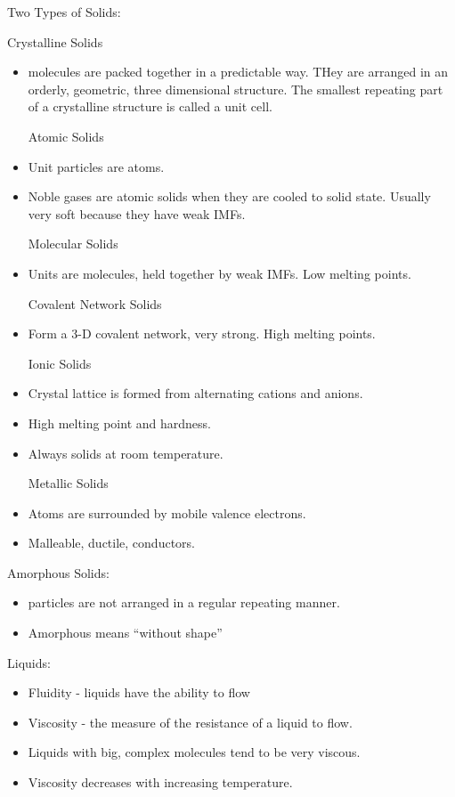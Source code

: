 \documentclass[../hchem.tex]{subfiles}
\begin{document}
Two Types of Solids:

Crystalline Solids
\begin{itemize}
    \item molecules are packed together in a predictable way. THey are arranged in an orderly, geometric, three dimensional 
    structure. The smallest repeating part of a crystalline structure is called a unit cell.

    Atomic Solids 
    \item Unit particles are atoms.
    \item Noble gases are atomic solids when they are cooled to solid state. Usually very soft because they have weak IMFs.
    
    Molecular Solids 
    \item Units are molecules, held together by weak IMFs. Low melting points.
    
    Covalent Network Solids 
    \item Form a 3-D covalent network, very strong. High melting points.
    
    Ionic Solids 
    \item Crystal lattice is formed from alternating cations and anions.
    \item High melting point and hardness.
    \item Always solids at room temperature.
    
    Metallic Solids 
    \item Atoms are surrounded by mobile valence electrons.
    \item Malleable, ductile, conductors.
\end{itemize}

Amorphous Solids:
\begin{itemize}
    \item particles are not arranged in a regular repeating manner.
    \item Amorphous means ``without shape''
\end{itemize}

Liquids:
\begin{itemize}
    \item Fluidity - liquids have the ability to flow 
    \item Viscosity - the measure of the resistance of a liquid to flow.
    \item Liquids with big, complex molecules tend to be very viscous.
    \item Viscosity decreases with increasing temperature.
\end{itemize}
\end{document}
